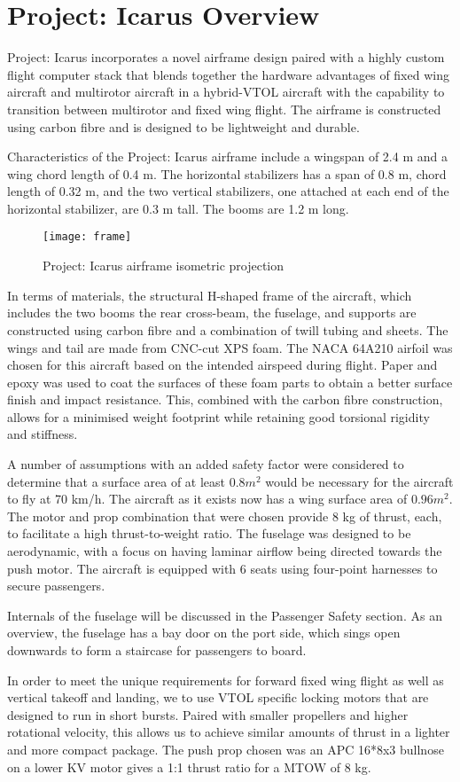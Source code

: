\section{Project: Icarus Overview}
\label{sec:overview}

Project: Icarus incorporates a novel airframe design paired with a highly
custom flight computer stack that blends together the hardware advantages of
fixed wing aircraft and multirotor aircraft in a hybrid-VTOL aircraft with the
capability to transition  between multirotor and fixed wing flight. The
airframe is constructed using carbon  fibre and is designed to be lightweight
and durable.

Characteristics of the Project: Icarus airframe include a wingspan of 2.4 m and
a wing chord length of 0.4 m. The horizontal stabilizers has a span of 0.8 m,
chord length of 0.32 m, and the two vertical stabilizers, one attached at each
end of the horizontal stabilizer, are 0.3 m tall. The booms are 1.2 m long.

\begin{figure}[ht]
        \centering
        \texttt{[image: frame]}
        \caption{Project: Icarus airframe isometric projection}
\end{figure}

In terms of materials, the structural H-shaped frame of the aircraft, which
includes the two booms the rear cross-beam, the fuselage, and supports are
constructed using carbon fibre and a combination of twill tubing and sheets.
The wings and tail are made from CNC-cut XPS foam. The NACA 64A210 airfoil was
chosen for this aircraft based on the intended airspeed during flight. Paper
and epoxy was used to coat the surfaces of these foam parts to obtain a better
surface finish and impact resistance. This, combined with the carbon fibre
construction, allows for a minimised weight footprint while retaining good
torsional rigidity and stiffness. 

A number of assumptions with an added safety factor were considered to
determine that a surface area of at least $0.8 m^2$ would be necessary for the
aircraft to fly at 70 km/h. The aircraft as it exists now has a wing surface
area of $0.96 m^2$. The motor and prop combination that were chosen provide 8
kg of thrust, each, to facilitate a high thrust-to-weight ratio. The fuselage
was designed to be aerodynamic, with a focus on having laminar airflow being
directed towards the push motor. The aircraft is equipped with 6 seats using
four-point harnesses to secure passengers.

Internals of the fuselage will be discussed in the Passenger Safety section. As
an overview, the fuselage has a bay door on the port side, which sings open
downwards to form a staircase for passengers to board.

In order to meet the unique requirements for forward fixed wing flight as well
as vertical takeoff and landing, we to use VTOL specific locking motors that
are designed to run in short bursts. Paired with smaller propellers and higher
rotational velocity, this allows us to achieve similar amounts of thrust in a
lighter and more compact package. The push prop chosen was an APC 16*8x3
bullnose on a lower KV motor gives a 1:1 thrust ratio for a MTOW of 8 kg.
